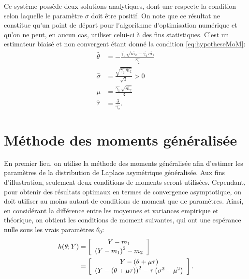 Ce système possède deux solutions analytiques, dont une respecte la
condition selon laquelle le paramètre $\sigma$ doit être positif. On
note que ce résultat ne constitue qu'un point de départ pour
l'algorithme d'optimisation numérique et qu'on ne peut, en aucun cas,
utiliser celui-ci à des fins statistiques. C'est un estimateur biaisé
et non convergent étant donné la condition \eqref{eq:hypotheseMoM}:
\begin{subequations}\label{eq:ptdepartGAL}
  \begin{align}
    \hat\theta &=-\frac{\hat{\gamma_1}\,\sqrt{\hat{m_2}}-\hat{\gamma_2}\,\hat{m_1}}{\hat{\gamma_2}} \label{eq:ptdepartGAL1}\\
    \hat\sigma &= \frac{\sqrt{\hat{\gamma_2}\,\hat{m_2}}}{\sqrt{3}} > 0 \label{eq:ptdepartGAL2}\\
    \hat\mu &= \frac{\hat{\gamma_1}\,\sqrt{\hat{m_2}}}{3} \label{eq:ptdepartGAL3}\\
    \hat\tau &= \frac{3}{\hat{\gamma_2}}. \label{eq:ptdepartGAL4}
  \end{align}
\end{subequations}
    
\section{Méthode des moments généralisée}

En premier lieu, on utilise la méthode des moments généralisée afin
d'estimer les paramètres de la distribution de Laplace asymétrique
généralisée. Aux fins d'illustration, seulement deux conditions de
moments seront utilisées. Cependant, pour obtenir des résultats
optimaux en termes de convergence asymptotique, on doit utiliser au
moins autant de conditions de moment que de paramètres. Ainsi, en
considérant la différence entre les moyennes et variances empirique et
théorique, on obtient les conditions de moment suivantes, qui ont une
espérance nulle sous les vrais paramètres $\theta_0$:
\begin{align}
  h(\theta;Y) &= \left[\begin{array}[]{c}
      Y - m_1 \\
      \left(Y - m_1 \right)^2 - m_2
    \end{array}\right] \label{eq:condmom}\\
  &= \left[\begin{array}[]{c}
      Y - \left(\theta+\mu\tau\right) \\
      \left(Y - \left(\theta+\mu\tau\right) \right)^2 -
      \tau\left(\sigma^2+\mu^2\right)
    \end{array}\right]. \label{eq:condmomGAL}
\end{align}

